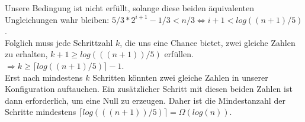 Unsere Bedingung ist nicht erfüllt, solange diese beiden äquivalenten Ungleichungen wahr bleiben: $5/3*2^{i+1} -1/3<n/3  \Leftrightarrow i+1<log((n+1)/5)$. \\
Folglich muss jede Schrittzahl $k$, die uns eine Chance bietet, zwei gleiche Zahlen zu erhalten, $k+1\geq log(((n+1))/5)$ erfüllen. $\Rightarrow k\geq \lceil log((n+1)/5)  \rceil-1$. \\
Erst nach mindestens $k$ Schritten könnten zwei gleiche Zahlen in unserer Konfiguration auftauchen. Ein zusätzlicher Schritt mit diesen beiden Zahlen ist dann erforderlich, um eine Null zu erzeugen. Daher ist die Mindestanzahl der Schritte mindestens $\lceil log(((n+1))/5) \rceil= \Omega (log(n))$.